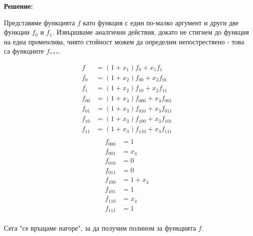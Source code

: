 \documentclass[11pt, oneside]{article}   	%
\begin{document}
\textbf{Решение:}

Представяме функцията $f$ като функция с един по-малко аргумент и други две функции $f_0$ и $f_1$. Извършваме аналгични действия, докато не стигнем до функция на една променлива, чиято стойност можем да определим непострествено - това са функциите $f_{***}$.

\begin{multicols}{2}
\begin{align*}
    f &= (1 + x_1)f_0 + x_1f_1 \\
    f_0 &= (1 + x_2)f_{00} + x_2f_{01} \\
    f_1 &= (1 + x_2)f_{10} + x_2f_{11} \\
    f_{00} &= (1 + x_3)f_{000} + x_3f_{001} \\
    f_{01} &= (1 + x_3)f_{010} + x_3f_{011} \\
    f_{10} &= (1 + x_3)f_{100} + x_3f_{101} \\
    f_{11} &= (1 + x_3)f_{110} + x_3f_{111} \\
\end{align*}
\columnbreak
\begin{align*}
    f_{000} &= 1 \\
    f_{001} &= x_4 \\
    f_{010} &= 0 \\
    f_{011} &= 0 \\
    f_{100} &= 1 + x_4 \\
    f_{101} &= 1 \\
    f_{110} &= x_4 \\
    f_{111} &= 1 \\
\end{align*}
\end{multicols}

Сега "се връщаме нагоре", за да получим полином за функцията $f$.
\end{document}
